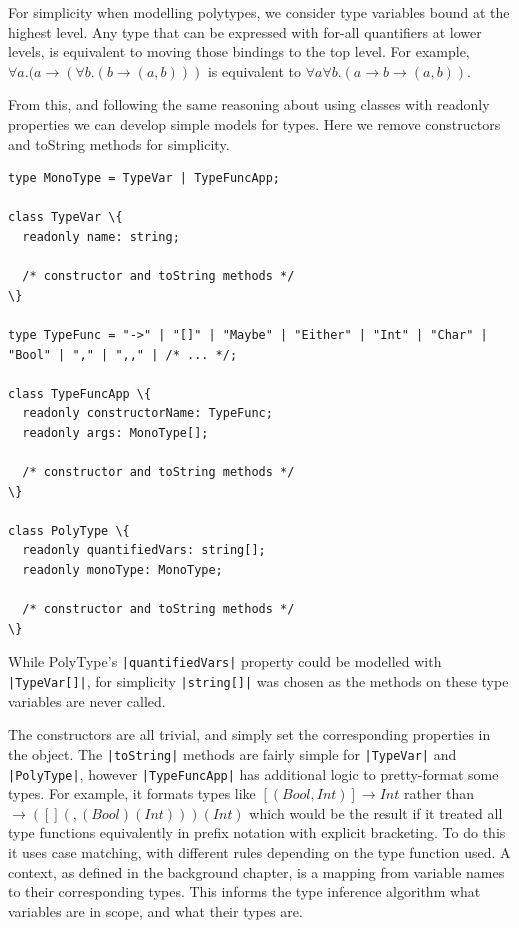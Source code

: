 \documentclass[a4paper,fleqn,12pt]{article}
\begin{document}
For simplicity when modelling polytypes, we consider type variables bound at the highest level. Any type that can be expressed with for-all quantifiers at lower levels, is equivalent to moving those bindings to the top level. For example, $\forall a. (a \rightarrow (\forall b. (b \rightarrow (a, b)))$ is equivalent to $\forall a \forall b. (a \rightarrow b \rightarrow (a, b))$.

From this, and following the same reasoning about using classes with readonly properties we can develop simple models for types. Here we remove constructors and toString methods for simplicity.

\begin{verbatim}
type MonoType = TypeVar | TypeFuncApp;

class TypeVar \{
  readonly name: string;

  /* constructor and toString methods */
\}

type TypeFunc = "->" | "[]" | "Maybe" | "Either" | "Int" | "Char" | "Bool" | "," | ",," | /* ... */;

class TypeFuncApp \{
  readonly constructorName: TypeFunc;
  readonly args: MonoType[];

  /* constructor and toString methods */
\}

class PolyType \{
  readonly quantifiedVars: string[];
  readonly monoType: MonoType;

  /* constructor and toString methods */
\}
\end{verbatim}

While PolyType’s \texttt{|quantifiedVars|} property could be modelled with \texttt{|TypeVar[]|}, for simplicity \texttt{|string[]|} was chosen as the methods on these type variables are never called.

The constructors are all trivial, and simply set the corresponding properties in the object. The \texttt{|toString|} methods are fairly simple for \texttt{|TypeVar|} and \texttt{|PolyType|}, however \texttt{|TypeFuncApp|} has additional logic to pretty-format some types. For example, it formats types like $[(Bool, Int)] \rightarrow Int$ rather than $\rightarrow ([] (, (Bool) (Int))) (Int)$ which would be the result if it treated all type functions equivalently in prefix notation with explicit bracketing. To do this it uses case matching, with different rules depending on the type function used.
\label{id:h.ux3btyb2wvh8}
A context, as defined in the background chapter, is a mapping from variable names to their corresponding types. This informs the type inference algorithm what variables are in scope, and what their types are.
\end{document}
